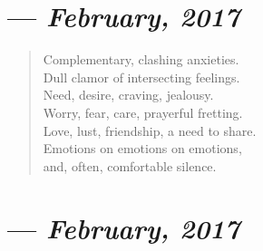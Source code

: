 \section{--- \textit{February, 2017}}

\begin{verse}
  Complementary, clashing anxieties.\\
  Dull clamor of intersecting feelings.\\
  Need, desire, craving, jealousy.\\
  Worry, fear, care, prayerful fretting.\\
  Love, lust, friendship, a need to share.\\
  Emotions on emotions on emotions,\\
  and, often, comfortable silence.
\end{verse}
\newpage

\section{--- \textit{February, 2017}}


